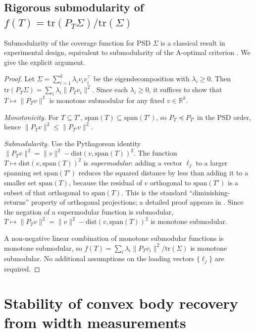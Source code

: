 \documentclass{article}
\begin{document}
\subsection*{Rigorous submodularity of $f(T) = \mathrm{tr}(P_T \Sigma)/\mathrm{tr}(\Sigma)$}

Submodularity of the coverage function for PSD $\Sigma$ is a classical
result in experimental design, equivalent to submodularity of the
A-optimal criterion \citep{daskempe2011submodular, krause2008submodular}.
We give the explicit argument.

\begin{proof}
Let $\Sigma = \sum_{i=1}^k \lambda_i v_i v_i^\top$ be the
eigendecomposition with $\lambda_i \ge 0$. Then
$\mathrm{tr}(P_T \Sigma) = \sum_i \lambda_i \|P_T v_i\|^2$. Since
each $\lambda_i \ge 0$, it suffices to show that $T \mapsto \|P_T
v\|^2$ is monotone submodular for any fixed $v \in \mathbb{R}^k$.

\emph{Monotonicity.} For $T \subseteq T'$, $\mathrm{span}(T) \subseteq
\mathrm{span}(T')$, so $P_T \preceq P_{T'}$ in the PSD order, hence
$\|P_T v\|^2 \le \|P_{T'} v\|^2$.

\emph{Submodularity.} Use the Pythagorean identity
$\|P_T v\|^2 = \|v\|^2 - \mathrm{dist}(v, \mathrm{span}(T))^2$. The
function $T \mapsto \mathrm{dist}(v, \mathrm{span}(T))^2$ is
\emph{supermodular}: adding a vector $\ell_j$ to a larger spanning
set $\mathrm{span}(T')$ reduces the squared distance by less than
adding it to a smaller set $\mathrm{span}(T)$, because the residual
of $v$ orthogonal to $\mathrm{span}(T')$ is a subset of that
orthogonal to $\mathrm{span}(T)$. This is the standard
``diminishing-returns'' property of orthogonal projections; a
detailed proof appears in \citet[Proposition 1]{daskempe2011submodular}.
Since the negation of a supermodular function is submodular,
$T \mapsto \|P_T v\|^2 = \|v\|^2 - \mathrm{dist}(v, \mathrm{span}(T))^2$
is monotone submodular.

A non-negative linear combination of monotone submodular functions is
monotone submodular, so $f(T) = \sum_i \lambda_i \|P_T v_i\|^2 /
\mathrm{tr}(\Sigma)$ is monotone submodular. No additional assumptions
on the loading vectors $\{\ell_j\}$ are required.
\end{proof}

\section{Stability of convex body recovery from width measurements}
\label{app:proof4}
\end{document}
